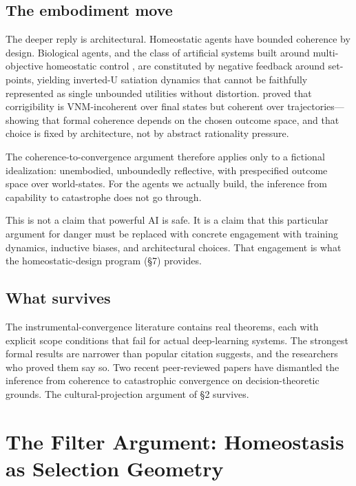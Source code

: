 \documentclass[11pt,twocolumn]{article}
\begin{document}
\subsection{The embodiment move}

The deeper reply is architectural. Homeostatic agents have bounded
coherence by design. Biological agents, and the class of artificial systems
built around multi-objective homeostatic control \citep{PihlakasPyykko2024},
are constituted by negative feedback around set-points, yielding inverted-U
satiation dynamics that cannot be faithfully represented as single
unbounded utilities without distortion. \citet{Turner2022c} proved that
corrigibility is VNM-incoherent over final states but coherent over
trajectories—showing that formal coherence depends on the chosen outcome
space, and that choice is fixed by architecture, not by abstract
rationality pressure.

The coherence-to-convergence argument therefore applies only to a
fictional idealization: unembodied, unboundedly reflective, with
prespecified outcome space over world-states. For the agents we actually
build, the inference from capability to catastrophe does not go through.

This is not a claim that powerful AI is safe. It is a claim that this
particular argument for danger must be replaced with concrete engagement
with training dynamics, inductive biases, and architectural choices. That
engagement is what the homeostatic-design program (\S 7) provides.

\subsection{What survives}

The instrumental-convergence literature contains real theorems, each with
explicit scope conditions that fail for actual deep-learning systems. The
strongest formal results are narrower than popular citation suggests, and
the researchers who proved them say so. Two recent peer-reviewed papers
have dismantled the inference from coherence to catastrophic convergence
on decision-theoretic grounds. The cultural-projection argument of \S 2
survives.

\section{The Filter Argument: Homeostasis as Selection Geometry}
\end{document}
